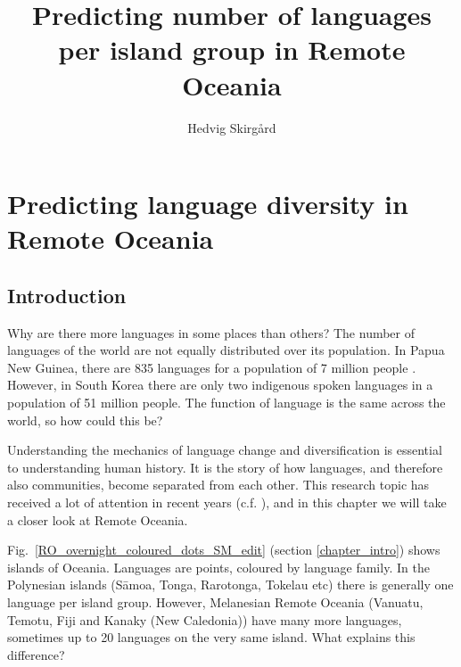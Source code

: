 \documentclass[a4paper,10pt]{article} %
\title{Predicting number of languages per island group in Remote Oceania}
\author{Hedvig Skirg{\aa}rd}
\begin{document}
\def\code#1{\texttt{#1}}

\thispagestyle{empty}

\maketitle
\thispagestyle{empty}

\newpage



\newpage
\singlespacing
\tableofcontents

\newpage
\listoffigures
 \listoftables
 \vspace{0.7cm}


\newpage
{}



\newpage

\section{Predicting language diversity in Remote Oceania}
\label{chapter_pol_complex}
\subsection{Introduction}
\doublespacing
Why are there more languages in some places than others? The number of languages of the world are not equally distributed over its population. In Papua New Guinea, there are 835 languages for a population of 7 million people \citep{ethnologue22, cia_world_factbook_2019}. However, in South Korea there are only two indigenous spoken languages in a population of 51 million people. The function of language is the same across the world, so how could this be?

Understanding the mechanics of language change and diversification is essential to understanding human history. It is the story of how languages, and therefore also communities, become separated from each other. This research topic has received a lot of attention in recent years (c.f. \citet{gavin2017process,  greenhill2015demographic, Pacheco_Coelho_2019, hua2019ecological}), and in this chapter we will take a closer look at Remote Oceania. 

Fig.~\ref{RO_overnight_coloured_dots_SM_edit} (section \ref{chapter_intro}) shows islands of Oceania. Languages are points, coloured by language family. In the Polynesian islands (S\={a}moa, Tonga, Rarotonga, Tokelau etc) there is generally one language per island group. However, Melanesian Remote Oceania (Vanuatu, Temotu, Fiji and Kanaky (New Caledonia)) have many more languages, sometimes up to 20 languages on the very same island. What explains this difference?
\end{document}
